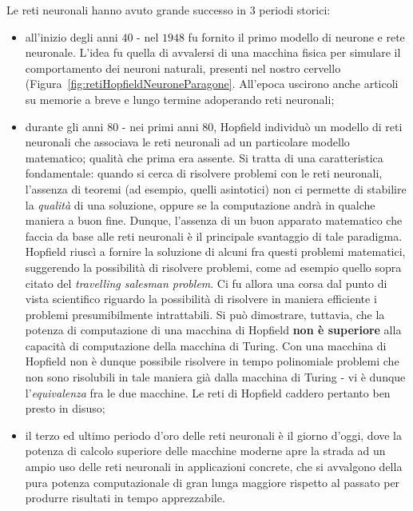 \documentclass[10pt]{book}
\begin{document}
Le reti neuronali hanno avuto grande successo in $3$ periodi storici:
\begin{itemize}
    \item all'inizio degli anni $40$ \-- nel $1948$ fu fornito il primo modello
        di neurone e rete neuronale. L'idea fu quella di avvalersi di una
        macchina fisica per simulare il comportamento dei neuroni naturali,
        presenti nel nostro cervello
        (Figura~\ref{fig:retiHopfieldNeuroneParagone}. All'epoca uscirono anche
        articoli su memorie a breve e lungo termine adoperando reti neuronali;
    \item durante gli anni $80$ \-- nei primi anni $80$, Hopfield individuò un
        modello di reti neuronali che associava le reti neuronali ad un
        particolare modello matematico; qualità che prima era assente. Si
        tratta di una caratteristica fondamentale: quando si cerca di risolvere
        problemi con le reti neuronali, l'assenza di teoremi (ad esempio,
        quelli asintotici) non ci permette di stabilire la \emph{qualità} di
        una soluzione, oppure se la computazione andrà in qualche maniera a
        buon fine. Dunque, l'assenza di un buon apparato matematico che faccia
        da base alle reti neuronali è il principale svantaggio di tale
        paradigma. Hopfield riuscì a fornire la soluzione di alcuni fra questi
        problemi matematici, suggerendo la possibilità di risolvere problemi,
        come ad esempio quello sopra citato del \emph{travelling salesman
        problem}. Ci fu allora una corsa dal punto di vista scientifico
        riguardo la possibilità di risolvere in maniera efficiente i problemi
        presumibilmente intrattabili. Si può dimostrare, tuttavia, che la
        potenza di computazione di una macchina di Hopfield \textbf{non è
        superiore} alla capacità di computazione della macchina di Turing. Con
        una macchina di Hopfield non è dunque possibile risolvere in tempo
        polinomiale problemi che non sono risolubili in tale maniera già dalla
        macchina di Turing \-- vi è dunque l'\emph{equivalenza} fra le due
        macchine. Le reti di Hopfield caddero pertanto ben presto in disuso;
    \item il terzo ed ultimo periodo d'oro delle reti neuronali è il giorno
        d'oggi, dove la potenza di calcolo superiore delle macchine moderne
        apre la strada ad un ampio uso delle reti neuronali in applicazioni
        concrete, che si avvalgono della pura potenza computazionale di gran
        lunga maggiore rispetto al passato per produrre risultati in tempo
        apprezzabile.
\end{itemize}
\end{document}
